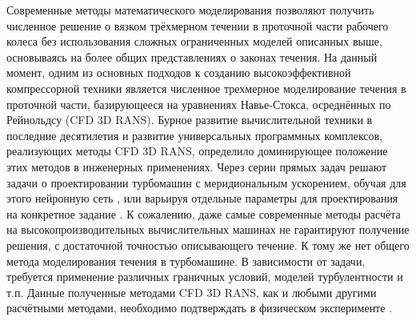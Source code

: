 Современные методы математического моделирования позволяют получить численное решение о вязком трёхмерном течении в проточной части рабочего колеса без использования сложных ограниченных моделей описанных выше, основываясь на более общих представлениях о законах течения. На данный момент, одним из основных подходов к созданию высокоэффективной компрессорной техники является численное трехмерное моделирование течения в проточной части, базирующееся на уравнениях Навье-Стокса, осреднённых по Рейнольдсу (CFD 3D RANS). Бурное развитие вычислительной техники в последние десятилетия и развитие универсальных программных комплексов, реализующих методы CFD 3D RANS, определило доминирующее положение этих методов в инженерных применениях. Через серии прямых задач решают задачи о проектировании турбомашин с меридиональным ускорением, обучая для этого нейронную сеть \cite{Bamberger2017}, или варьируя отдельные параметры для проектирования на конкретное задание \cite{Qiushi2010,Kim2018}. К сожалению, даже самые современные методы расчёта на высокопроизводительных вычислительных машинах не гарантируют получение решения, с достаточной точностью описывающего течение. К тому же нет общего метода моделирования течения в турбомашине. В зависимости от задачи, требуется применение различных граничных условий, моделей турбулентности и т.п. Данные полученные методами CFD 3D RANS, как и любыми другими расчётными методами, необходимо подтверждать в физическом эксперименте \cite{Michaud2016,Pandya2020}. 

\FloatBarrier
